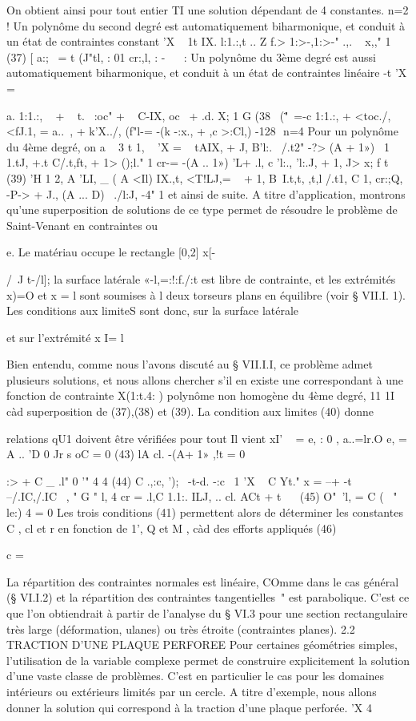 {{On obtient ainsi pour tout entier TI une solution dépendant de 4 constantes. 
n=2 ! Un polynôme du second degré est automatiquement biharmonique, et con­duit à un état de contraintes constant 
'X ~ 1t IX. l:1.:,t .. Z f.> 1:>-,1:>-" .,. ~ x,," 1 
(37) 
[ 
a:;~ = t (J"tl, : 01 cr:,l, : -~ 
~ : Un polynôme du 3ème degré est aussi automatiquement biharmonique, et conduit à un état de contraintes linéaire 
-t
'X = { a. 1:1.:, ~ + ~ t. ~:oc" + ~ C-IX, oc~ + .d. X; 1 
G 
(38~ 
{ (\""\0\ =-c 1:1.:, + <toc./, <fJ.1, = a..~, + k'X../, (f"l-= -(k -:x., + ,c >:Cl,) 
-128 ­
n=4 Pour un polynôme du 4ème degré, on a 
~ 3 	t 1, ~ 
'X = 	~ tAIX, + J, B'l:.~ /.t2" -?> (A + 1») ~1 1.tJ, +.t C/.t,ft}, + 1> ();l." 1 cr-= -(A .. 1») 'L+ .l, c 'l:., 'l:.J, + 1, J> x;
f 	t 
(39) 'H 	1 
2, A 'LI, 	_ ( A <Il) IX.,t,
<T!LJ,= ~ + 1, B~I.t,t, ,t,l /.t1, C 1,
cr:;Q,~ -P-> + J., (A ... D)~ ./l:J, -4"
1 
et ainsi de suite. A titre d'application, montrons qu'une superposition de solutions de ce type permet de résoudre le problème de Saint-Venant en contraintes ou 

e. 
Le matériau occupe le rectangle [0,2] x[-{/~J t-/l]; la surface latérale «-l,=:!:f./:t est libre de contrainte, et les extrémités x)=O et x = l sont soumises à
l 
deux torseurs plans en équilibre (voir § VII.I. 1). Les conditions aux limi­teS sont donc, sur la surface latérale 

et sur l'extrémité x I= l 

Bien entendu, comme nous l'avons discuté au § VII.I.I, ce problème admet plusieurs solutions, et nous allons chercher s'il en existe une correspondant à une fonction de contrainte X(1:t.4: ) polynôme non homogène du 4ème degré,
11 1I
càd 	superposition de (37),(38) et (39). La condition aux limites (40) donne 

relations qU1 doivent être vérifiées pour tout Il vient
xI' 
~ 
= e, 	: 0 , a..=lr.O e, = A .. 'D 0 Jr s oC = 0 
(43) 
lA cl. -(A+ 1» ,!t = 0 {:> + C _ .l" 0
'" 
4 	4 
(44) C .,:c, ');~ -t-d. -:c~ 1 'X ~ C Yt."
x = --+ -t --/.IC,/.IC~
, " G " l, 4 
cr = .l,C 1.1:. ILJ, .. cl. ACt + t
~~ 
(45) 
O"~'l, = C ( ~" le:)
4 
= 0 
Les trois conditions (41) permettent alors de déterminer les constantes C , cl et r en fonction de 1', Q et M , càd des efforts appliqués 
(46) 

c = 

La répartition des contraintes normales est linéaire, COmme dans le cas général (§ VI.I.2) et la répartition des contraintes tangentielles~" est parabolique. C'est ce que l'on obtiendrait à partir de l'analyse du § VI.3 pour une section rectangulaire très large (déformation, ulanes) ou très étroite (contraintes planes). 
2.2 TRACTION D'UNE PLAQUE PERFOREE 
Pour certaines géométries simples, l'utilisation de la variable complexe permet de construire explicitement la solution d'une vaste classe 
de problèmes. C'est en particulier le cas pour les domaines intérieurs ou extérieurs limités par un cercle. A titre d'exemple, nous allons donner la 
solution qui correspond à la traction d'une plaque perforée. 
'X 4 ~~ 

}}}}}
